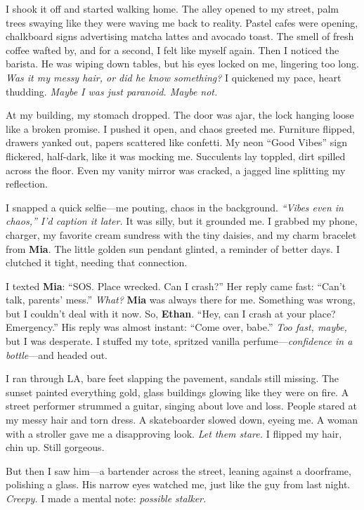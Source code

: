 \documentclass{article}
\begin{document}
I shook it off and started walking home. The alley opened to my street, palm trees swaying like they were waving me back to reality. Pastel cafes were opening, chalkboard signs advertising matcha lattes and avocado toast. The smell of fresh coffee wafted by, and for a second, I felt like myself again. Then I noticed the barista. He was wiping down tables, but his eyes locked on me, lingering too long. \textit{Was it my messy hair, or did he know something?} I quickened my pace, heart thudding. \textit{Maybe I was just paranoid. Maybe not.}

At my building, my stomach dropped. The door was ajar, the lock hanging loose like a broken promise. I pushed it open, and chaos greeted me. Furniture flipped, drawers yanked out, papers scattered like confetti. My neon “Good Vibes” sign flickered, half-dark, like it was mocking me. Succulents lay toppled, dirt spilled across the floor. Even my vanity mirror was cracked, a jagged line splitting my reflection.

I snapped a quick selfie—me pouting, chaos in the background. \textit{“Vibes even in chaos,” I’d caption it later.} It was silly, but it grounded me. I grabbed my phone, charger, my favorite cream sundress with the tiny daisies, and my charm bracelet from \textbf{Mia}. The little golden sun pendant glinted, a reminder of better days. I clutched it tight, needing that connection.

I texted \textbf{Mia}: “SOS. Place wrecked. Can I crash?” Her reply came fast: “Can’t talk, parents’ mess.” \textit{What?} \textbf{Mia} was always there for me. Something was wrong, but I couldn’t deal with it now. So, \textbf{Ethan}. “Hey, can I crash at your place? Emergency.” His reply was almost instant: “Come over, babe.” \textit{Too fast, maybe,} but I was desperate. I stuffed my tote, spritzed vanilla perfume—\textit{confidence in a bottle}—and headed out.

I ran through LA, bare feet slapping the pavement, sandals still missing. The sunset painted everything gold, glass buildings glowing like they were on fire. A street performer strummed a guitar, singing about love and loss. People stared at my messy hair and torn dress. A skateboarder slowed down, eyeing me. A woman with a stroller gave me a disapproving look. \textit{Let them stare.} I flipped my hair, chin up. Still gorgeous.

But then I saw him—a bartender across the street, leaning against a doorframe, polishing a glass. His narrow eyes watched me, just like the guy from last night. \textit{Creepy.} I made a mental note: \textit{possible stalker.}
\end{document}
